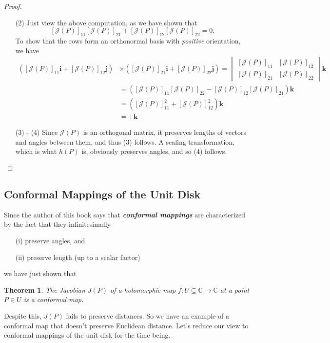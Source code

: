 \documentclass[10pt]{article}
\theoremstyle{plain}
\newtheorem{theorem}{Theorem}
\begin{document}
\begin{proof}
\begin{itemize}
			\item[(2)] Just view the above computation, as we have shown that $$[\mathcal{J}(P)]_{11} [\mathcal{J}(P)]_{21} + [\mathcal{J}(P)]_{12} [\mathcal{J}(P)]_{22} = 0.$$ To show that the rows form an orthonormal basis with \textit{positive} orientation, we have
				\begin{align*}
					([\mathcal{J}(P)]_{11} \mathbf{i} + [\mathcal{J}(P)]_{12} \mathbf{j}) &\times ([\mathcal{J}(P)]_{21} \mathbf{i} + [\mathcal{J}(P)]_{22} \mathbf{j}) = \begin{vmatrix} [\mathcal{J}(P)]_{11} &  [\mathcal{J}(P)]_{12} \\  [\mathcal{J}(P)]_{21} & [\mathcal{J}(P)]_{22}\end{vmatrix} \mathbf{k} \\
					&= ([\mathcal{J}(P)]_{11} [\mathcal{J}(P)]_{22} - [\mathcal{J}(P)]_{12} [\mathcal{J}(P)]_{21})\mathbf{k} \\
					&= ([\mathcal{J}(P)]_{11}^2 + [\mathcal{J}(P)]_{12}^2) \mathbf{k}\\
					&= +\mathbf{k}
				\end{align*}
			
			\item[(3) - (4)] Since $\mathcal{J}(P)$ is an orthogonal matrix, it preserves lengths of vectors and angles between them, and thus (3) follows. A scaling transformation, which is what $h(P)$ is, obviously preserves angles, and so (4) follows. 
		\end{itemize}
	\end{proof}

\subsection*{Conformal Mappings of the Unit Disk}
\noindent Since the author of this book says that\textbf{\textit{ conformal mappings}} are characterized by the fact that they infinitesimally 
	\begin{itemize}
		\item[(i)] preserve angles, and
		\item[(ii)] preserve length (up to a scalar factor) 
	\end{itemize}
we have just shown that
	\begin{theorem}
		The Jacobian $J(P)$ of a holomorphic map $f: U \subseteq \mathbb{C} \to \mathbb{C}$ at a point $P \in U$ is a conformal map. 
	\end{theorem}
\noindent 
	Despite this, $J(P)$ fails to preserve distances. So we have an example of a conformal map that doesn't preserve Euclidean distance. Let's reduce our view to conformal mappings of the unit disk for the time being. 
\end{document}
